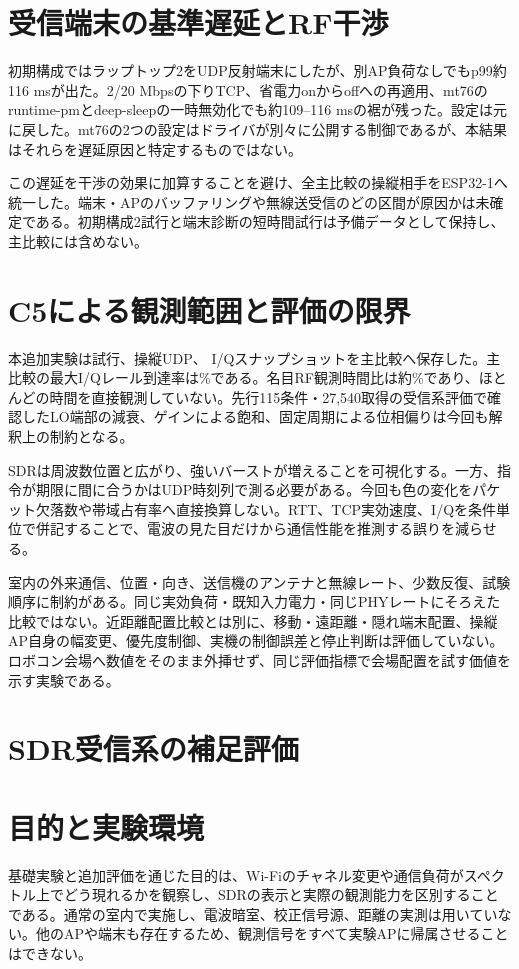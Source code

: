 \documentclass[a4paper,10pt]{ltjsarticle}
\begin{document}
\section{受信端末の基準遅延とRF干渉}
初期構成ではラップトップ2をUDP反射端末にしたが、別AP負荷なしでもp99約116 msが出た。2/20 Mbpsの下りTCP、省電力onからoffへの再適用、mt76のruntime-pmとdeep-sleepの一時無効化でも約109--116 msの裾が残った。設定は元に戻した。mt76の2つの設定はドライバが別々に公開する制御である\cite{mt76debug}が、本結果はそれらを遅延原因と特定するものではない。

この遅延を干渉の効果に加算することを避け、全主比較の操縦相手をESP32-1へ統一した。端末・APのバッファリングや無線送受信のどの区間が原因かは未確定である。初期構成2試行と端末診断の短時間試行は予備データとして保持し、主比較には含めない。

\section{C5による観測範囲と評価の限界}
本追加実験は\Conditions{}試行、\ControlPackets{}操縦UDP、\Snapshots{} I/Qスナップショットを主比較へ保存した。主比較の最大I/Qレール到達率は\RailMax{}\%である。名目RF観測時間比は約\DutyRatio{}\%であり、ほとんどの時間を直接観測していない。先行115条件・27,540取得の受信系評価で確認したLO端部の減衰、ゲインによる飽和、固定周期による位相偏りは今回も解釈上の制約となる。

SDRは周波数位置と広がり、強いバーストが増えることを可視化する。一方、指令が期限に間に合うかはUDP時刻列で測る必要がある。今回も色の変化をパケット欠落数や帯域占有率へ直接換算しない。RTT、TCP実効速度、I/Qを条件単位で併記することで、電波の見た目だけから通信性能を推測する誤りを減らせる。

室内の外来通信、位置・向き、送信機のアンテナと無線レート、少数反復、試験順序に制約がある。同じ実効負荷・既知入力電力・同じPHYレートにそろえた比較ではない。近距離配置比較とは別に、移動・遠距離・隠れ端末配置、操縦AP自身の幅変更、優先度制御、実機の制御誤差と停止判断は評価していない。ロボコン会場へ数値をそのまま外挿せず、同じ評価指標で会場配置を試す価値を示す実験である。

\clearpage\section*{SDR受信系の補足評価}
\graphicspath{{../experiments/figures/baseline/}}
\section{目的と実験環境}
基礎実験と追加評価を通じた目的は、Wi-Fiのチャネル変更や通信負荷がスペクトル上でどう現れるかを観察し、SDRの表示と実際の観測能力を区別することである。通常の室内で実施し、電波暗室、校正信号源、距離の実測は用いていない。他のAPや端末も存在するため、観測信号をすべて実験APに帰属させることはできない。
\end{document}

